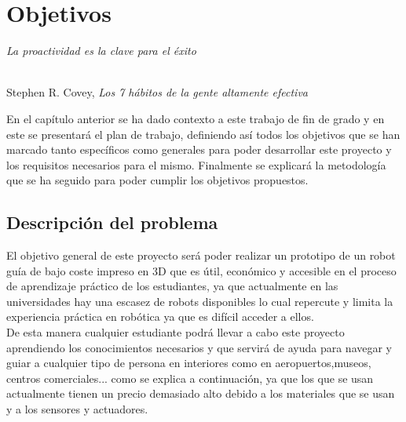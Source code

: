 \chapter{Objetivos}
\label{cap:capitulo3}

\begin{flushright}
\begin{minipage}[]{10cm}
\emph{La proactividad es la clave para el éxito}\\
\end{minipage}\\

Stephen R. Covey, \textit{Los 7 hábitos de la gente altamente efectiva}\\
\end{flushright}

\vspace{1cm}

En el capítulo anterior se ha dado contexto a este trabajo de fin de grado y en este se presentará el plan de trabajo, definiendo así todos los 
objetivos que se han marcado tanto específicos como generales para poder desarrollar este proyecto y los requisitos necesarios para el mismo.
Finalmente se explicará la metodología que se ha seguido para poder cumplir los objetivos propuestos.\\



\section{Descripción del problema}
\label{sec:descripcion}

\vspace{0.9cm}
El objetivo general de este proyecto será poder realizar un prototipo de un robot guía de bajo coste impreso en 3D que es útil, económico y 
accesible en el proceso de aprendizaje práctico de los estudiantes, ya que actualmente en las universidades hay una escasez de robots disponibles lo cual repercute y limita la experiencia práctica en robótica ya que es difícil acceder a ellos.\\


De esta manera cualquier estudiante podrá llevar a cabo este proyecto aprendiendo los conocimientos necesarios y que servirá de ayuda para navegar y guiar a cualquier tipo de persona en interiores como en aeropuertos,museos, centros comerciales... como se explica a continuación, ya que los que se usan actualmente tienen un precio demasiado alto debido a los materiales que se usan y a los sensores y actuadores.\\ \\

